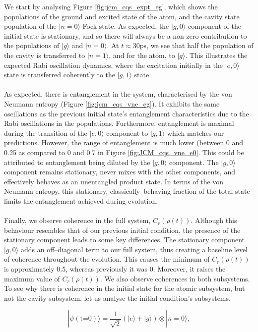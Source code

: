 \documentclass[11pt]{article}
\begin{document}
\noindent We start by analysing Figure \ref{fig:jcm_cqs_expt_eg}, which shows the populations of the ground and excited state of the atom, and the cavity state population of the $|n=0\rangle$ Fock state. As expected, the $|g,0\rangle$ component of the initial state is stationary, and so there will always be a non-zero contribution to the populations of $|g\rangle$ and $|n=0\rangle$. At $t\approx 30\text{ps}$, we see that half the population of the cavity is transferred to $|n=1\rangle$, and for the atom, to $|g\rangle$. This illustrates the expected Rabi oscillation dynamics, where the excitation initially in the $|e,0\rangle$ state is transferred coherently to the $|g,1\rangle$ state. \\
\\
As expected, there is entanglement in the system, characterised by the von Neumann entropy (Figure \ref{fig:jcm_cqs_vne_eg}). It exhibits the same oscillations as the previous initial state's entanglement characteristics due to the Rabi oscillations in the populations. Furthermore, entanglement is maximal during the transition of the $|e,0\rangle$ component to $|g,1\rangle$ which matches our predictions. However, the range of entanglement is much lower (between 0 and 0.25 as compared to 0 and 0.7 in Figure \ref{fig:JCM_cqs_vne_e0}. This could be attributed to entanglement being diluted by the $|g,0\rangle$ component. The $|g,0\rangle$ component remains stationary, never mixes with the other components, and effectively behaves as an unentangled product state.
In terms of the von Neumann entropy, this stationary, classically--behaving fraction of the total state limits the entanglement achieved during evolution.\\
\\
Finally, we observe coherence in the full system, $C_r(\rho(t))$. Although this behaviour resembles that of our previous initial condition,  the presence of the stationary component leads to some key differences. The stationary component $|g,0\rangle$ adds an off--diagonal term to our full system, thus creating a baseline level of coherence throughout the evolution. This causes the minimum of $C_r(\rho(t))$ is approximately 0.5, whereas previously it was 0. Moreover, it raises the maximum value of $C_r(\rho(t))$. We also observe coherences in both subsystems. To see why there is coherence in the initial state for the atomic subsystem, but not the cavity subsystem, let us analyse the initial condition's subsystems.

\begin{equation*}
    |\psi (\text{t=0})\rangle = \frac{1}{\sqrt{2}}(|e\rangle + |g\rangle)\otimes|n=0\rangle,
\end{equation*}
\end{document}
